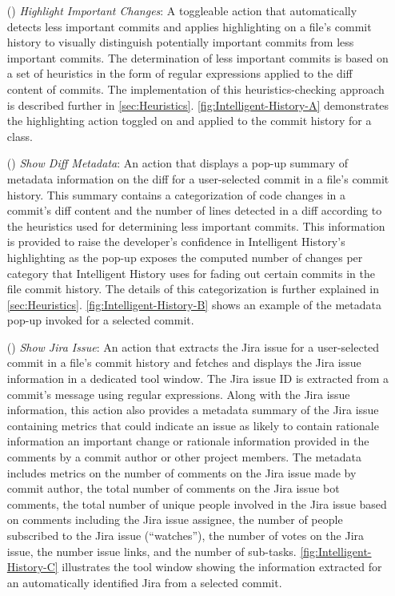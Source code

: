 \begin{itemize}
    \item[(\feature{1})] \textit{Highlight Important Changes}: 
        A toggleable action that automatically detects less important commits and applies highlighting on a file's commit history to visually distinguish potentially important commits from less important commits. 
        The determination of less important commits is based on a set of heuristics in the form of regular expressions applied to the diff content of commits. 
        The implementation of this heuristics-checking approach is described further in \autoref{sec:Heuristics}. 
        \autoref{fig:Intelligent-History-A} demonstrates the highlighting action toggled on and applied to the commit history for a class.
    \item[(\feature{2})] \textit{Show Diff Metadata}: 
        An action that displays a pop-up summary of metadata information on the diff for a user-selected commit in a file's commit history. 
        This summary contains a categorization of code changes in a commit's diff content and the number of lines detected in a diff according to the heuristics used for determining less important commits. 
        This information is provided to raise the developer's confidence in Intelligent History's highlighting as the pop-up exposes the computed number of changes per category that Intelligent History uses for fading out certain commits in the file commit history. 
        The details of this categorization is further explained in \autoref{sec:Heuristics}. \autoref{fig:Intelligent-History-B} shows an example of the metadata pop-up invoked for a selected commit.
    \item[(\feature{3})] \textit{Show Jira Issue}: 
        An action that extracts the Jira issue  for a user-selected commit in a file's commit history and fetches and displays the Jira issue information in a dedicated tool window. 
        The Jira issue ID is extracted from a commit's message using regular expressions. Along with the Jira issue information, 
        this action also provides a metadata summary of the Jira issue containing metrics that could indicate an issue as likely to contain rationale information  an
        important change or rationale information provided in the comments by a commit author or other project members. 
        The metadata includes metrics on the number of comments on the Jira issue made by commit author, 
        the total number of comments on the Jira issue  bot comments, 
        the total number of unique people involved in the Jira issue based on comments including the Jira issue assignee, 
        the number of people subscribed to the Jira issue (``watches''), the number of votes on the Jira issue, the number  issue links, 
        and the number of sub-tasks. \autoref{fig:Intelligent-History-C} illustrates the tool window showing the information extracted for an automatically identified Jira  from a selected commit.
\end{itemize}

